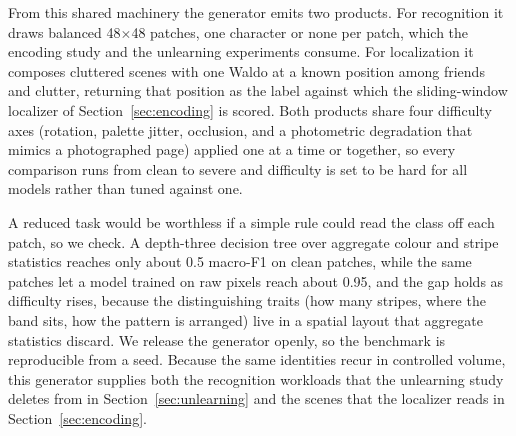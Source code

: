 From this shared machinery the generator emits two products. For recognition it draws balanced 48$\times$48 patches, one character or none per patch, which the encoding study and the unlearning experiments consume. For localization it composes cluttered scenes with one Waldo at a known position among friends and clutter, returning that position as the label against which the sliding-window localizer of Section~\ref{sec:encoding} is scored. Both products share four difficulty axes (rotation, palette jitter, occlusion, and a photometric degradation that mimics a photographed page) applied one at a time or together, so every comparison runs from clean to severe and difficulty is set to be hard for all models rather than tuned against one.

A reduced task would be worthless if a simple rule could read the class off each patch, so we check. A depth-three decision tree over aggregate colour and stripe statistics reaches only about 0.5 macro-F1 on clean patches, while the same patches let a model trained on raw pixels reach about 0.95, and the gap holds as difficulty rises, because the distinguishing traits (how many stripes, where the band sits, how the pattern is arranged) live in a spatial layout that aggregate statistics discard. We release the generator openly, so the benchmark is reproducible from a seed. Because the same identities recur in controlled volume, this generator supplies both the recognition workloads that the unlearning study deletes from in Section~\ref{sec:unlearning} and the scenes that the localizer reads in Section~\ref{sec:encoding}.
